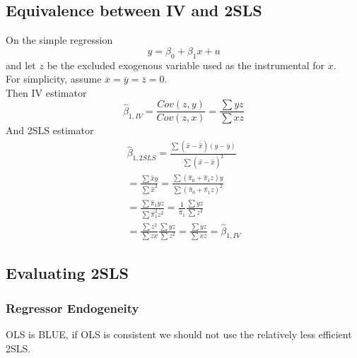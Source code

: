 \documentclass[]{article}
\begin{document}
		\subsection{Equivalence between IV and 2SLS}
			\par On the simple regression 
			\[
				y = \beta_0 + \beta_1 x + u
			\]
			and let $z$ be the excluded exogenous variable used as the instrumental for $x$. \\
			For simplicity, assume $\overline{x} = \overline{y} = \overline{z} = 0$. \\
			Then IV estimator 
			\[
				\hat{\beta}_{1, IV} = \frac{Cov(z,y)}{Cov(z,x)} = \frac{\sum{yz}}{\sum{xz}}
			\]
			And 2SLS estimator
			\begin{gather*}
				\hat{\beta}_{1,2SLS} = \frac{\sum (\hat{x} - \overline{\hat{x}}) (y - \overline{y})}{\sum (\hat{x} - \overline{\hat{x}})^2} \\
				= \frac{\sum \hat{x} y}{\sum \hat{x}^2}
				= \frac{\sum (\hat{\pi}_0 + \hat{\pi}_1 z) y}{\sum (\hat{\pi}_0 + \hat{\pi}_1 z)^2} \\
				= \frac{\sum \hat{\pi}_1 y z}{\sum \hat{\pi}_1^2 z^2}
				= \frac{1}{\hat{\pi}_1} \frac{\sum yz}{\sum z^2} \\
				= \frac{\sum z^2}{\sum zx} \frac{\sum yz}{\sum z^2} = \frac{\sum yz}{\sum xz} = \hat{\beta}_{1, IV}
			\end{gather*}
	\subsection{Evaluating 2SLS}
		\subsubsection{Regressor Endogeneity}
			\par OLS is BLUE, if OLS is consistent we should not use the relatively less efficient 2SLS.
\end{document}
